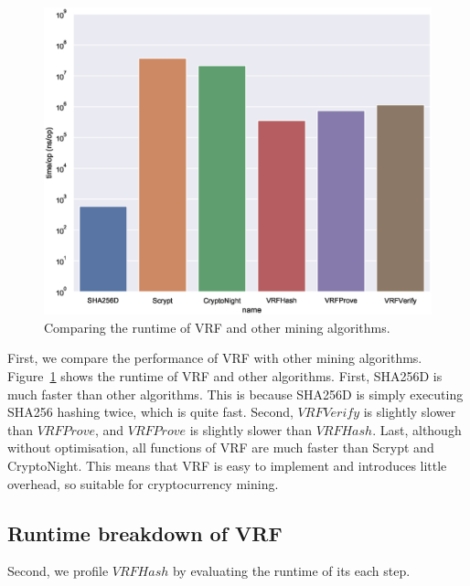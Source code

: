 \begin{figure}[htp]
    \centering
    \includegraphics[width=.7\linewidth]{figs/runtime-comparison.eps}
    \caption{Comparing the runtime of VRF and other mining algorithms.}
    \label{fig:runtime-comparison}
\end{figure}

First, we compare the performance of VRF with other mining algorithms.
Figure~\ref{fig:runtime-comparison} shows the runtime of VRF and other algorithms.
First, SHA256D is much faster than other algorithms.
This is because SHA256D is simply executing SHA256 hashing twice, which is quite fast.
Second, $VRFVerify$ is slightly slower than $VRFProve$, and $VRFProve$ is slightly slower than $VRFHash$.
Last, although without optimisation, all functions of VRF are much faster than Scrypt and CryptoNight.
This means that VRF is easy to implement and introduces little overhead, so suitable for cryptocurrency mining.



\subsection{Runtime breakdown of VRF}

Second, we profile $VRFHash$ by evaluating the runtime of its each step.
